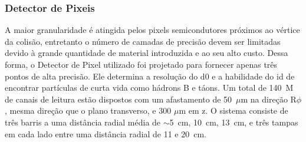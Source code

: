 \begin{table}
\centering
{}
\caption[Parâmetros do ID]
{Parâmetros do ID. As resoluções estão citadas em valores típicos (a
resolução verdadeira em cada detector depende do ângulo de impacto). Adaptado de
\cite{ATLAS_TDR}.}
\label{tab:info_id}
\end{table}



\subsubsection{Detector de Pixeis}
\label{sssec:pixeis}

A maior granularidade é atingida pelos pixels semicondutores próximos
ao vértice da colisão, entretanto o número de camadas de precisão devem ser
limitadas devido à grande quantidade de material introduzida e ao seu alto
custo. Dessa forma, o Detector de Pixel utilizado foi projetado para
fornecer apenas três pontos de alta precisão. Ele determina a resolução do
\gls{d0} e a habilidade do \gls{id} de encontrar partículas de curta
vida como hádrons B e táons. Um total de 140~M de canais de
leitura estão dispostos com um afastamento de 50~$\mu$m na direção R$\phi$, 
mesma direção que o plano transverso, e 300 $\mu$m em z. 
O sistema consiste de três barris a uma distância radial
média de $\sim$5~cm, 10~cm, 13~cm, e três tampas em cada lado entre uma distância 
radial de 11 e 20~cm.

